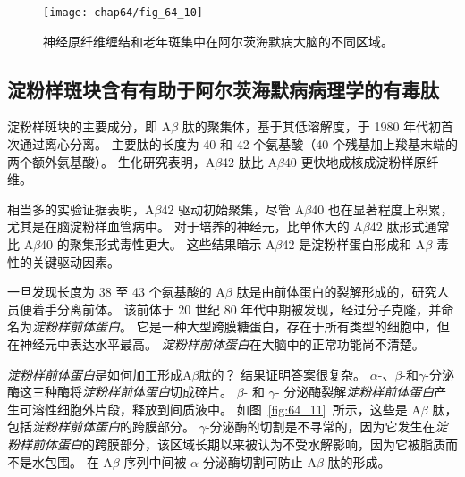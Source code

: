 \begin{figure}[htbp]
	\centering
	\texttt{[image: chap64/fig\_64\_10]}
	\caption{神经原纤维缠结和老年斑集中在阿尔茨海默病大脑的不同区域\cite{arnold1991topographical}。}
	\label{fig:64_10}
\end{figure}



\subsection{淀粉样斑块含有有助于阿尔茨海默病病理学的有毒肽}

淀粉样斑块的主要成分，即 A$\beta$ 肽的聚集体，基于其低溶解度，于 1980 年代初首次通过离心分离。
主要肽的长度为 40 和 42 个氨基酸（40 个残基加上羧基末端的两个额外氨基酸）。
生化研究表明，A$\beta$42 肽比 A$\beta$40 更快地成核成淀粉样原纤维。


相当多的实验证据表明，A$\beta$42 驱动初始聚集，尽管 A$\beta$40 也在显著程度上积累，尤其是在脑淀粉样血管病中。
对于培养的神经元，比单体大的 A$\beta$42 肽形式通常比 A$\beta$40 的聚集形式毒性更大。
这些结果暗示 A$\beta$42 是淀粉样蛋白形成和 A$\beta$ 毒性的关键驱动因素。


一旦发现长度为 38 至 43 个氨基酸的 A$\beta$ 肽是由前体蛋白的裂解形成的，研究人员便着手分离前体。
该前体于 20 世纪 80 年代中期被发现，经过分子克隆，并命名为\textit{淀粉样前体蛋白}。
它是一种大型跨膜糖蛋白，存在于所有类型的细胞中，但在神经元中表达水平最高。
\textit{淀粉样前体蛋白}在大脑中的正常功能尚不清楚。


\textit{淀粉样前体蛋白}是如何加工形成A$\beta$肽的？
结果证明答案很复杂。
$\alpha$-、$\beta$-和$\gamma$-分泌酶这三种酶将\textit{淀粉样前体蛋白}切成碎片。
$\beta$- 和 $\gamma$- 分泌酶裂解\textit{淀粉样前体蛋白}产生可溶性细胞外片段，释放到间质液中。
如图~\ref{fig:64_11}~所示，这些是 A$\beta$ 肽，包括\textit{淀粉样前体蛋白}的跨膜部分。
$\gamma$-分泌酶的切割是不寻常的，因为它发生在\textit{淀粉样前体蛋白}的跨膜部分，该区域长期以来被认为不受水解影响，因为它被脂质而不是水包围。
在 A$\beta$ 序列中间被 $\alpha$-分泌酶切割可防止 A$\beta$ 肽的形成。


